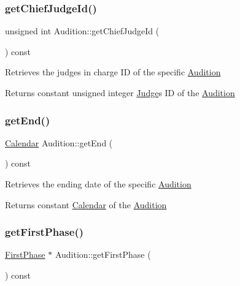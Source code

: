 \subsubsection{\texorpdfstring{get\+Chief\+Judge\+Id()}{getChiefJudgeId()}}
{\footnotesize\ttfamily unsigned int Audition\+::get\+Chief\+Judge\+Id (\begin{DoxyParamCaption}{ }\end{DoxyParamCaption}) const}

Retrieves the judge\textquotesingle{}s in charge ID of the specific \hyperlink{class_audition}{Audition} \begin{DoxyReturn}{Returns}
constant unsigned integer \hyperlink{class_judge}{Judge}\textquotesingle{}s ID of the \hyperlink{class_audition}{Audition} 
\end{DoxyReturn}
\mbox{\label{class_audition_aed384fcdc7ec6567c102b489bcf8c6aa}} 
\subsubsection{\texorpdfstring{get\+End()}{getEnd()}}
{\footnotesize\ttfamily \hyperlink{class_calendar}{Calendar} Audition\+::get\+End (\begin{DoxyParamCaption}{ }\end{DoxyParamCaption}) const}

Retrieves the ending date of the specific \hyperlink{class_audition}{Audition} \begin{DoxyReturn}{Returns}
constant \hyperlink{class_calendar}{Calendar} of the \hyperlink{class_audition}{Audition} 
\end{DoxyReturn}
\mbox{\label{class_audition_ae725b5105db0f9350bc2a63593fa28b2}} 
\subsubsection{\texorpdfstring{get\+First\+Phase()}{getFirstPhase()}}
{\footnotesize\ttfamily \hyperlink{class_first_phase}{First\+Phase} $\ast$ Audition\+::get\+First\+Phase (\begin{DoxyParamCaption}{ }\end{DoxyParamCaption}) const}

